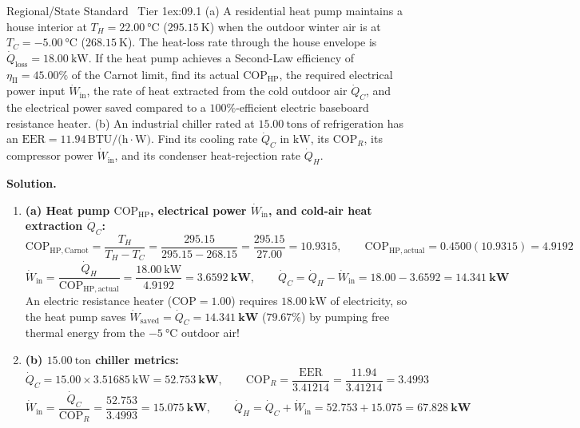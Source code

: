 \begin{workedexample}{Regional/State Standard \textbar\ Tier 1}{ex:09.1}
(a) A residential heat pump maintains a house interior at $T_H = \SI{22.00}{\celsius}$ ($\SI{295.15}{\kelvin}$) when the outdoor winter air is at $T_C = \SI{-5.00}{\celsius}$ ($\SI{268.15}{\kelvin}$). The heat-loss rate through the house envelope is $\dot{Q}_{\mathrm{loss}} = \SI{18.00}{\kilo\watt}$. If the heat pump achieves a Second-Law efficiency of $\eta_{\mathrm{II}} = 45.00\%$ of the Carnot limit, find its actual $\mathrm{COP}_{\mathrm{HP}}$, the required electrical power input $\dot{W}_{\mathrm{in}}$, the rate of heat extracted from the cold outdoor air $\dot{Q}_C$, and the electrical power saved compared to a $100\%$-efficient electric baseboard resistance heater.
(b) An industrial chiller rated at $\SI{15.00}{\text{tons of refrigeration}}$ has an $\mathrm{EER} = 11.94\,\si{\text{BTU}\per(\hour\cdot\watt)}$. Find its cooling rate $\dot{Q}_C$ in $\si{\kilo\watt}$, its $\mathrm{COP}_R$, its compressor power $\dot{W}_{\mathrm{in}}$, and its condenser heat-rejection rate $\dot{Q}_H$.
\par\smallskip\noindent
\textbf{Solution.}
\begin{enumerate}
  \item \textbf{(a) Heat pump $\mathrm{COP}_{\mathrm{HP}}$, electrical power $\dot{W}_{\mathrm{in}}$, and cold-air heat extraction $\dot{Q}_C$:}
  \[
    \mathrm{COP}_{\mathrm{HP,Carnot}} = \frac{T_H}{T_H - T_C} = \frac{295.15}{295.15 - 268.15} = \frac{295.15}{27.00} = \mathbf{10.9315}, \qquad \mathrm{COP}_{\mathrm{HP,actual}} = 0.4500(10.9315) = \mathbf{4.9192}
  \]
  \[
    \dot{W}_{\mathrm{in}} = \frac{\dot{Q}_H}{\mathrm{COP}_{\mathrm{HP,actual}}} = \frac{\SI{18.00}{\kilo\watt}}{4.9192} = \mathbf{\SI{3.6592}{\kilo\watt}}, \qquad \dot{Q}_C = \dot{Q}_H - \dot{W}_{\mathrm{in}} = 18.00 - 3.6592 = \mathbf{\SI{14.341}{\kilo\watt}}
  \]
  An electric resistance heater ($\mathrm{COP} = 1.00$) requires $\SI{18.00}{\kilo\watt}$ of electricity, so the heat pump saves $\dot{W}_{\mathrm{saved}} = \dot{Q}_C = \mathbf{\SI{14.341}{\kilo\watt}}$ ($79.67\%$) by pumping free thermal energy from the $\SI{-5}{\celsius}$ outdoor air!
  \item \textbf{(b) $\SI{15.00}{\text{ton}}$ chiller metrics:}
  \[
    \dot{Q}_C = 15.00 \times \SI{3.51685}{\kilo\watt} = \mathbf{\SI{52.753}{\kilo\watt}}, \qquad \mathrm{COP}_R = \frac{\mathrm{EER}}{3.41214} = \frac{11.94}{3.41214} = \mathbf{3.4993}
  \]
  \[
    \dot{W}_{\mathrm{in}} = \frac{\dot{Q}_C}{\mathrm{COP}_R} = \frac{52.753}{3.4993} = \mathbf{\SI{15.075}{\kilo\watt}}, \qquad \dot{Q}_H = \dot{Q}_C + \dot{W}_{\mathrm{in}} = 52.753 + 15.075 = \mathbf{\SI{67.828}{\kilo\watt}}
  \]
\end{enumerate}
\end{workedexample}

